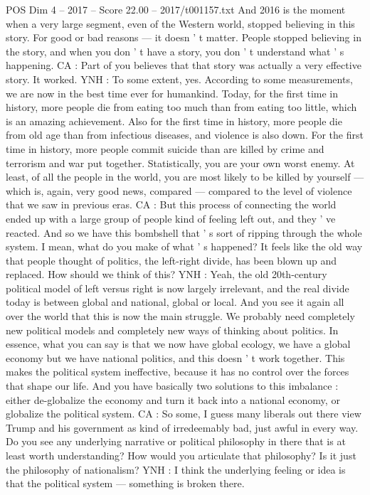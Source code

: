 \begin{textsample}{POS Dim 4 – 2017 – Score 22.00 – 2017/t001157.txt}
And 2016 is the moment when a very large segment, even of the Western world, stopped believing in this story.
For good or bad reasons — it doesn ' t matter.
People stopped believing in the story, and when you don ' t have a story, you don ' t understand what ' s happening.
CA : Part of you believes that that story was actually a very effective story.
It worked.
YNH : To some extent, yes.
According to some measurements, we are now in the best time ever for humankind.
Today, for the first time in history, more people die from eating too much than from eating too little, which is an amazing achievement.
Also for the first time in history, more people die from old age than from infectious diseases, and violence is also down.
For the first time in history, more people commit suicide than are killed by crime and terrorism and war put together.
Statistically, you are your own worst enemy.
At least, of all the people in the world, you are most likely to be killed by yourself — which is, again, very good news, compared — compared to the level of violence that we saw in previous eras.
CA : But this process of connecting the world ended up with a large group of people kind of feeling left out, and they ' ve reacted.
And so we have this bombshell that ' s sort of ripping through the whole system.
I mean, what do you make of what ' s happened?
It feels like the old way that people thought of politics, the left-right divide, has been blown up and replaced.
How should we think of this?
YNH : Yeah, the old 20th-century political model of left versus right is now largely irrelevant, and the real divide today is between global and national, global or local.
And you see it again all over the world that this is now the main struggle.
We probably need completely new political models and completely new ways of thinking about politics.
In essence, what you can say is that we now have global ecology, we have a global economy but we have national politics, and this doesn ' t work together.
This makes the political system ineffective, because it has no control over the forces that shape our life.
And you have basically two solutions to this imbalance : either de-globalize the economy and turn it back into a national economy, or globalize the political system.
CA : So some, I guess many liberals out there view Trump and his government as kind of irredeemably bad, just awful in every way.
Do you see any underlying narrative or political philosophy in there that is at least worth understanding?
How would you articulate that philosophy?
Is it just the philosophy of nationalism?
YNH : I think the underlying feeling or idea is that the political system — something is broken there.

\end{textsample}
